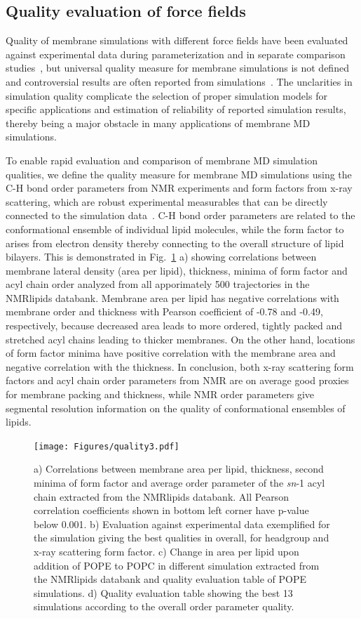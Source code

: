 \documentclass[fleqn,10pt]{wlscirep}
\begin{document}
\subsection{Quality evaluation of force fields}
Quality of membrane simulations with different force fields have been evaluated against experimental data during parameterization and in separate comparison studies~\cite{botan15,ollila16,catte16,pluhackova16,perez17,leonard19}, but universal quality measure for membrane simulations is not defined and controversial results are often reported from simulations~\cite{antila22b}. The unclarities in simulation quality complicate the selection of proper simulation models for specific applications and estimation of reliability of reported simulation results, thereby being a major obstacle in many applications of membrane MD simulations.

To enable rapid evaluation and comparison of membrane MD simulation qualities, we define the quality measure for membrane MD simulations using the C-H bond order parameters from NMR experiments and form factors from x-ray scattering, which are robust experimental measurables that can be directly connected to the simulation data~\cite{ollila16}. C-H bond order parameters are related to the conformational ensemble of individual lipid molecules, while the form factor to arises from electron density thereby connecting to the overall structure of lipid bilayers. This is demonstrated in Fig.~\ref{fig:quality} a) showing correlations between membrane lateral density (area per lipid), thickness, minima of form factor and acyl chain order analyzed from all apporimately 500 trajectories in the NMRlipids databank. Membrane area per lipid has negative correlations with membrane order and thickness with Pearson coefficient of -0.78 and -0.49, respectively, because decreased area leads to more ordered, tightly packed and stretched acyl chains leading to thicker membranes. On the other hand, locations of form factor minima have positive correlation with the membrane area and negative correlation with the thickness. In conclusion, both x-ray scattering form factors and acyl chain order parameters from NMR are on average good proxies for membrane packing and thickness, while NMR order parameters give segmental resolution information on the quality of conformational ensembles of lipids.

\begin{figure}[tbp]
    \centering
    \texttt{[image: Figures/quality3.pdf]}
    \caption{a) Correlations between membrane area per lipid, thickness, second minima of form factor and average order parameter of the {\it sn}-1 acyl chain extracted from the NMRlipids databank. All Pearson correlation coefficients shown in bottom left corner have p-value below 0.001.
    b) Evaluation against experimental data exemplified for the simulation giving the best qualities in overall, for headgroup and x-ray scattering form factor.
    c) Change in area per lipid upon addition of POPE to POPC in different simulation extracted from the NMRlipids databank and quality evaluation table of POPE simulations.
    d) Quality evaluation table showing the best 13 simulations according to the overall order parameter quality.}
    \label{fig:quality}
\end{figure}
\end{document}
